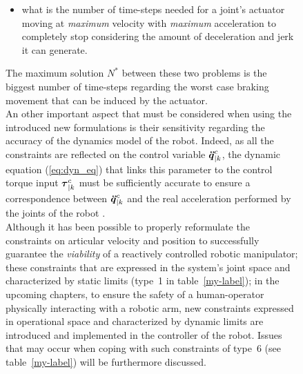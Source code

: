 \begin{figure}[!htbp]
\begin{itemize}
\item what is the number of time-steps needed for a joint's actuator moving at \textit{maximum} velocity with \textit{maximum} acceleration to completely stop considering the amount of deceleration and jerk it can generate.
\end{itemize}  
The maximum solution $N^*$ between these two problems is the biggest number of time-steps regarding the worst case braking movement that can be induced by the actuator. \\
An other important aspect that must be considered when using the introduced new formulations is their sensitivity regarding the accuracy of the dynamics model of the robot. Indeed, as all the constraints are reflected on the control variable $\mbox{\boldmath${\ddot{q}}$}_{|k}^{c}$, the dynamic equation (\ref{eq:dyn_eq}) that links this parameter to the control torque input $\mbox{\boldmath${\tau}$}_{|k}^{c}$ must be sufficiently accurate to ensure a correspondence between $\mbox{\boldmath${\ddot{q}}$}_{|k}^{c}$ and the real acceleration performed by the joints of the robot \cite{del2016robustness}. \\
Although it has been possible to properly reformulate the constraints on articular velocity and position to successfully guarantee the \textit{viability} of a reactively controlled robotic manipulator; these constraints that are expressed in the system's joint space and characterized by static limits (type~1 in table~\ref{my-label}); in the upcoming chapters, to ensure the safety of a human-operator physically interacting with a robotic arm, new constraints expressed in operational space and characterized by dynamic limits are introduced and implemented in the controller of the robot. Issues that may occur when coping with such constraints of type~6 (see table~\ref{my-label}) will be furthermore discussed.




\end{figure}
